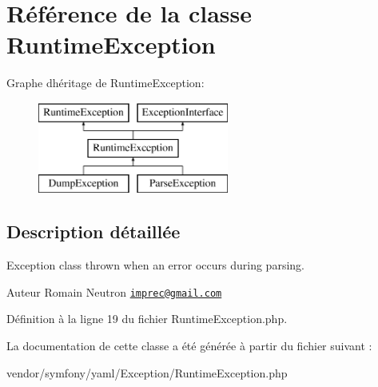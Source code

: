 \hypertarget{class_symfony_1_1_component_1_1_yaml_1_1_exception_1_1_runtime_exception}{}\section{Référence de la classe Runtime\+Exception}
\label{class_symfony_1_1_component_1_1_yaml_1_1_exception_1_1_runtime_exception}
Graphe d\textquotesingle{}héritage de Runtime\+Exception\+:\begin{figure}[H]
\begin{center}
\leavevmode
\includegraphics[height=3.000000cm]{class_symfony_1_1_component_1_1_yaml_1_1_exception_1_1_runtime_exception}
\end{center}
\end{figure}


\subsection{Description détaillée}
Exception class thrown when an error occurs during parsing.

\begin{DoxyAuthor}{Auteur}
Romain Neutron \href{mailto:imprec@gmail.com}{\tt imprec@gmail.\+com} 
\end{DoxyAuthor}


Définition à la ligne 19 du fichier Runtime\+Exception.\+php.



La documentation de cette classe a été générée à partir du fichier suivant \+:\begin{DoxyCompactItemize}
\item 
vendor/symfony/yaml/\+Exception/Runtime\+Exception.\+php\end{DoxyCompactItemize}
